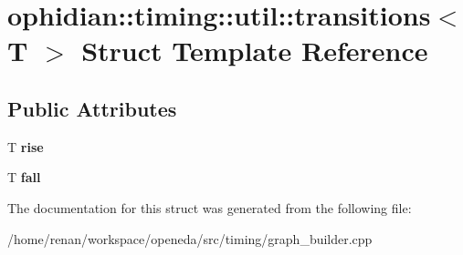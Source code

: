 \hypertarget{structophidian_1_1timing_1_1util_1_1transitions}{\section{ophidian\-:\-:timing\-:\-:util\-:\-:transitions$<$ T $>$ Struct Template Reference}
\label{structophidian_1_1timing_1_1util_1_1transitions}
}
\subsection*{Public Attributes}
\begin{DoxyCompactItemize}
\item 
\hypertarget{structophidian_1_1timing_1_1util_1_1transitions_a7931bfe0f82bff6b39b0041227c8db90}{T {\bfseries rise}}\label{structophidian_1_1timing_1_1util_1_1transitions_a7931bfe0f82bff6b39b0041227c8db90}

\item 
\hypertarget{structophidian_1_1timing_1_1util_1_1transitions_a7227a68139065b442926a6c300fb5d44}{T {\bfseries fall}}\label{structophidian_1_1timing_1_1util_1_1transitions_a7227a68139065b442926a6c300fb5d44}

\end{DoxyCompactItemize}


The documentation for this struct was generated from the following file\-:\begin{DoxyCompactItemize}
\item 
/home/renan/workspace/openeda/src/timing/graph\-\_\-builder.\-cpp\end{DoxyCompactItemize}
